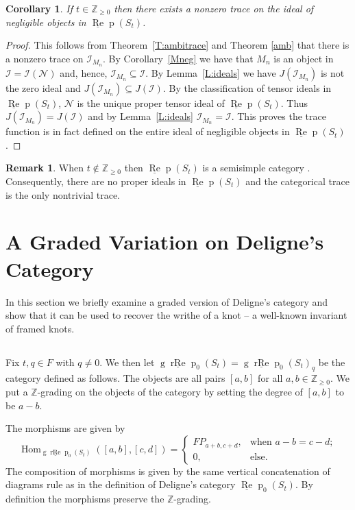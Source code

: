 \documentclass[12pt, reqno]{amsart}
\newtheorem{corollary}[theorem]{Corollary}
\theoremstyle{definition}
\newtheorem{remark}[theorem]{Remark}
\newcommand{\Hom}{\operatorname{Hom}}
\def\uRep{\underline{\operatorname{Re}}\!\operatorname{p}}
\renewcommand{\1}{_{(1)}}
\renewcommand{\2}{_{(2)}}
\newcommand{\3}{_{(3)}}
\newcommand{\4}{_{(4)}}
\newcommand{\mN}{{\mathcal N}}
\newcommand{\Z}{\mathbb{Z}}
\def\gruRep{\operatorname{g}\!\underline{\operatorname{rRe}}\!\operatorname{p}}
\newcommand{\ideal}{\mathcal{I}}
\begin{document}
\begin{corollary}\label{C:nonzerotrace} If $t\in\Z_{\geq 0}$ then there exists a nonzero trace on the ideal of negligible objects in $\uRep(S_t)$.
\end{corollary}

\begin{proof} This follows from Theorem~\ref{T:ambitrace} and Theorem \ref{amb} that there is a nonzero trace on $\ideal_{M_{n}}$. By Corollary~\ref{Mneg} we have that $M_{n}$ is an object in $\ideal = \ideal (\mN )$ and, hence, $\ideal_{M_{n}} \subseteq \ideal$.  By Lemma~\ref{L:ideals} we have $J(\ideal_{M_{n}})$ is not the zero ideal and $J(\ideal_{M_{n}}) \subseteq J(\ideal)$.  By the classification of tensor ideals in $\uRep(S_t)$, $\mN$ is the unique proper tensor ideal of $\uRep(S_t)$.  Thus $J(\ideal_{M_{n}}) = J(\ideal)$ and by Lemma~\ref{L:ideals} $\ideal_{M_{n}}=\ideal$.  This proves the trace function is in fact defined on the entire ideal of negligible objects in $\uRep(S_t)$.
\end{proof}
\begin{remark}\label{R:SemisimpleCase}  When $t \notin \Z_{\geq 0}$ then $\uRep (S_{t})$ is a semisimple category \cite[Th\'eor\`eme 2.18]{Del07}.  Consequently, there are no proper ideals in $\uRep (S_{t})$ and the categorical trace is the only nontrivial trace. 
\end{remark}


\section{A Graded Variation on Deligne's Category}\label{S:quantumdouble} In this section we briefly examine a graded version of Deligne's category and show that it can be used to recover the writhe of a knot -- a well-known invariant of framed knots.


\subsection{}\label{SS:gradedvariant}   

Fix $t,q \in F $ with $q \neq 0$.  We then let $\gruRep_{0}(S_{t})=\gruRep_{0}(S_{t})_{q}$ be the category defined as follows.  The objects are all pairs $[a,b]$ for all $a,b \in \Z_{\geq 0}$.  We put a $\Z$-grading on the objects of the category by setting the degree of $[a,b]$ to be $a-b$.   

The morphisms are given by 
\[
\Hom_{\gruRep_{0}(S_{t})}\left([a,b],[c,d] \right) = \begin{cases}  FP_{a+b,c+d} , &\text{when $a-b=c-d$}; \\
0, &\text{else}.
\end{cases}
\]  The composition of morphisms is given by the same vertical concatenation of diagrams rule as in the definition of Deligne's category $\uRep_{0}(S_{t})$.  By definition the morphisms preserve the $\Z$-grading.
\end{document}
